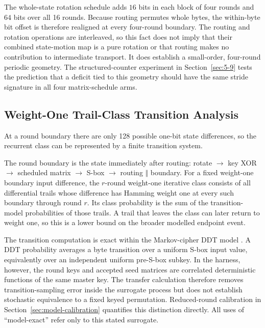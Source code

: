 \documentclass[cryptography,article,submit,oneauthor]{Definitions/mdpi}
\begin{document}
The whole-state rotation schedule adds $16$ bits in each block of four rounds and $64$ bits over all 16 rounds. Because routing permutes whole bytes, the within-byte bit offset is therefore realigned at every four-round boundary. The routing and rotation operations are interleaved, so this fact does not imply that their combined state-motion map is a pure rotation or that routing makes no contribution to intermediate transport. It does establish a small-order, four-round periodic geometry. The structured-counter experiment in Section~\ref{sec:5-9} tests the prediction that a deficit tied to this geometry should have the same stride signature in all four matrix-schedule arms.

\subsection{Weight-One Trail-Class Transition Analysis}\label{sec:3-7}
At a round boundary there are only 128 possible one-bit state differences, so the recurrent class can be represented by a finite transition system.

\begin{Definition}\label{def:w1class}
The round boundary is the state immediately after routing: rotate $\to$ key XOR $\to$ scheduled matrix $\to$ S-box $\to$ routing $\Vert$ boundary. For a fixed weight-one boundary input difference, the $r$-round weight-one iterative class consists of all differential trails whose difference has Hamming weight one at every such boundary through round $r$. Its class probability is the sum of the transition-model probabilities of those trails. A trail that leaves the class can later return to weight one, so this is a lower bound on the broader modelled endpoint event.
\end{Definition}

\begin{Remark}\label{rem:markov}
The transition computation is exact within the Markov-cipher DDT model \cite{ref54}. A DDT probability averages a byte transition over a uniform S-box input value, equivalently over an independent uniform pre-S-box subkey. In the harness, however, the round keys and accepted seed matrices are correlated deterministic functions of the same master key. The transfer calculation therefore removes transition-sampling error inside the surrogate process but does not establish stochastic equivalence to a fixed keyed permutation. Reduced-round calibration in Section~\ref{sec:model-calibration} quantifies this distinction directly. All uses of ``model-exact'' refer only to this stated surrogate.
\end{Remark}
\end{document}
